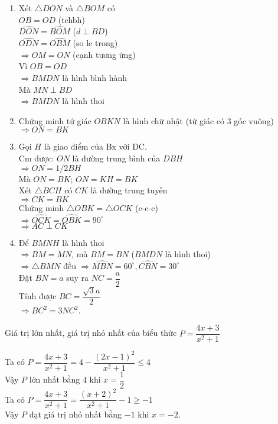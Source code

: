 \begin{ex}
{\begin{center}
\begin{tikzpicture}
\end{tikzpicture}
\end{center}
		\begin{enumerate} 
		\item Xét $\triangle DON$ và $\triangle BOM$ có \\
		$OB = OD$ (tchbh)\\
		$\widehat{DON} = \widehat{BOM}$ ($d\perp BD$)\\
		$\widehat{ODN} = \widehat{OBM}$ (so le trong)\\
		$\Rightarrow OM = ON$ (cạnh tương ứng)\\
		Vì $OB = OD$\\
		$\Rightarrow BMDN$ là hình bình hành\\
		Mà $MN \perp BD$\\
		$\Rightarrow BMDN$ là hình thoi
		\item Chứng minh tứ giác $OBKN$ là hình chữ nhật (tứ giác có 3 góc vuông)\\
		$\Rightarrow ON = BK$
		\item Gọi $H$ là giao điểm của Bx với DC.\\
		Cm được: $ON$ là đường trung bình của $DBH$\\
		$\Rightarrow ON = 1/2BH$\\
		Mà $ON = BK$; $ON = KH = BK$\\
		Xét $\triangle BCH$ có $CK$ là đường trung tuyến\\
		$\Rightarrow CK = BK$\\
		Chứng minh $\triangle OBK = \triangle OCK$ (c-c-c)\\
		$\Rightarrow \widehat{OCK} = \widehat{OBK} = 90^\circ$\\
		$\Rightarrow AC \perp CK$
		\item Để $BMNH$ là hình thoi\\
		$\Rightarrow BM = MN$, mà $BM = BN$ ($BMDN$ là hình thoi)\\
		$\Rightarrow \triangle BMN$ đều $\Rightarrow \widehat{MBN} = 60^\circ , \widehat{CBN} = 30^\circ$\\
		Đặt $BN = a$ suy ra $NC = \dfrac{a}{2}$\\
		Tính được $BC = \dfrac{\sqrt{3}a}{2}$\\
		$\Rightarrow BC^2 = 3NC^2$.
		
		\end{enumerate}
		}
\end{ex}




\begin{ex} %
Giá trị lớn nhất, giá trị nhỏ nhất của biểu thức $P = \dfrac{4x+3}{x^2+1}$

		\loigiai
		{Ta có $P =\dfrac{4x + 3}{x^2 + 1} = 4 - \dfrac{(2x - 1)^2}{x^2 + 1} \leq 4$
		}\\
		Vậy $P$ lớn nhất bằng $4$ khi $x = \dfrac{1}{2}$\\
		Ta có $P = \dfrac{{4x + 3}}{{{x^2} + 1}} = \dfrac{{{{(x + 2)}^2}}}{{{x^2} + 1}} - 1 \geq  - 1$\\
		Vậy $P$ đạt giá trị nhỏ nhất bằng $-1$ khi $x = -2$.
\end{ex}
